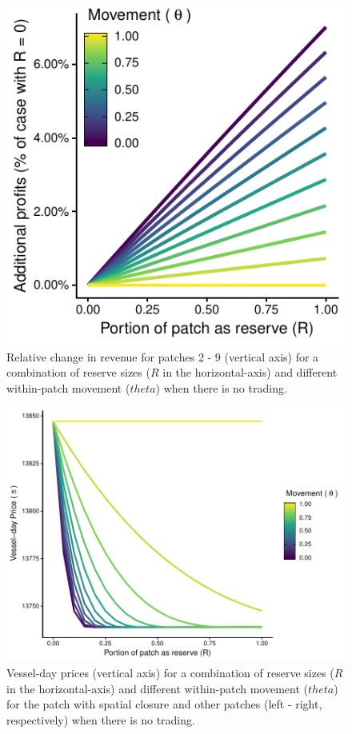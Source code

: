 \documentclass[12pt]{article}
\begin{document}
\begin{figure}
\centering
\includegraphics{img/profits_PNA_notKIR_no_trading_plot.pdf}
\caption{\label{fig:profits_PNA_notKIR_no_trading_plot}Relative change in revenue for patches 2 - 9 (vertical axis) for a combination of reserve sizes ($R$ in the horizontal-axis) and different within-patch movement ($theta$) when there is no trading.}
\end{figure}

\begin{figure}
\centering
\includegraphics{img/vessel_day_price_with_trading_plot.pdf}
\caption{\label{fig:vessel_day_price_with_trading_plot}Vessel-day prices (vertical axis) for a combination of reserve sizes ($R$ in the horizontal-axis) and different within-patch movement ($theta$) for the patch with spatial closure and other patches (left - right, respectively) when there is no trading.}
\end{figure}
\end{document}
